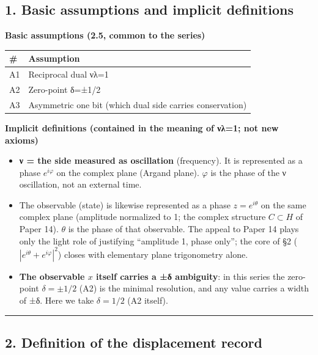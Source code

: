 \documentclass[
]{ltjsarticle}
\newcounter{none} %
\providecommand{\tightlist}{%
  \setlength{\itemsep}{0pt}\setlength{\parskip}{0pt}}
\begin{document}
\subsection{1. Basic assumptions and implicit
definitions}\label{basic-assumptions-and-implicit-definitions}

\textbf{Basic assumptions (2.5, common to the series)}

{\def\LTcaptype{none} %
\begin{longtable}[]{@{}ll@{}}
\toprule\noalign{}
\# & Assumption \\
\midrule\noalign{}
\endhead
\bottomrule\noalign{}
\endlastfoot
A1 & Reciprocal dual νλ=1 \\
A2 & Zero-point δ=±1/2 \\
A3 & Asymmetric one bit (which dual side carries conservation) \\
\end{longtable}
}

\textbf{Implicit definitions (contained in the meaning of νλ=1; not new
axioms)}

\begin{itemize}
\tightlist
\item
  \textbf{ν = the side measured as oscillation} (frequency). It is
  represented as a phase \(e^{i\varphi}\) on the complex plane (Argand
  plane). \(\varphi\) is the phase of the ν oscillation, not an external
  time.
\item
  The observable (state) is likewise represented as a phase
  \(z=e^{i\theta}\) on the same complex plane (amplitude normalized to
  1; the complex structure \(C\subset H\) of Paper 14). \(\theta\) is
  the phase of that observable. The appeal to Paper 14 plays only the
  light role of justifying ``amplitude 1, phase only''; the core of §2
  (\(|e^{i\theta}+e^{i\varphi}|^2\)) closes with elementary plane
  trigonometry alone.
\item
  \textbf{The observable \(x\) itself carries a ±δ ambiguity}: in this
  series the zero-point \(\delta=\pm 1/2\) (A2) is the minimal
  resolution, and any value carries a width of ±δ. Here we take
  \(\delta=1/2\) (A2 itself).
\end{itemize}

\begin{center}\rule{0.5\linewidth}{0.5pt}\end{center}

\subsection{2. Definition of the displacement
record}\label{definition-of-the-displacement-record}
\end{document}
